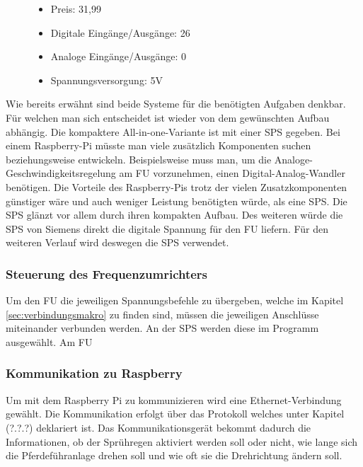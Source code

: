 \begin{figure}[H]
\begin{minipage}[t]{0.45\textwidth}
\begin{itemize}
	\item{Preis: 31,99\textsf{\texteuro}}
	\item{Digitale Eingänge/Ausgänge: 26}
	\item{Analoge Eingänge/Ausgänge: 0}
	\item{Spannungsversorgung: 5V}
\end{itemize}
\end{minipage}
\end{figure}

Wie bereits erwähnt sind beide Systeme für die benötigten Aufgaben denkbar. Für welchen man sich entscheidet ist wieder von dem gewünschten Aufbau abhängig. Die kompaktere All-in-one-Variante ist mit einer SPS gegeben. Bei einem Raspberry-Pi müsste man viele zusätzlich Komponenten suchen beziehungsweise entwickeln. Beispielsweise muss man, um die Analoge-Geschwindigkeitsregelung am \ac{FU} vorzunehmen, einen Digital-Analog-Wandler benötigen. Die Vorteile des Raspberry-Pis trotz der vielen Zusatzkomponenten günstiger wäre und auch weniger Leistung benötigten würde, als eine SPS. Die SPS glänzt vor allem durch ihren kompakten Aufbau. Des weiteren würde die SPS von Siemens direkt die digitale Spannung für den \ac{FU} liefern. Für den weiteren Verlauf wird deswegen die SPS verwendet. 

\subsubsection{Steuerung des Frequenzumrichters}
\label{sec:steuerungFU}

Um den \acl{FU} die jeweiligen Spannungsbefehle zu übergeben, welche im Kapitel \ref{sec:verbindungsmakro} zu finden sind, müssen die jeweiligen Anschlüsse miteinander verbunden werden. An der SPS werden diese im Programm ausgewählt. Am \ac{FU} 

\subsubsection{Kommunikation zu Raspberry}
\label{sec:kommunikationZuRaspberry}


Um mit dem Raspberry Pi zu kommunizieren wird eine Ethernet-Verbindung gewählt. Die Kommunikation erfolgt über das Protokoll welches unter Kapitel (?.?.?) deklariert ist. Das Kommunikationsgerät bekommt dadurch die Informationen, ob der Sprühregen aktiviert werden soll oder nicht, wie lange sich die Pferdeführanlage drehen soll und wie oft sie die Drehrichtung ändern soll.

